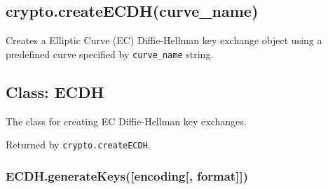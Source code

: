 \begin{Shaded}
\begin{Highlighting}[]
 \NormalTok{(}\NormalTok{);}
 \NormalTok{(}\NormalTok{);}
 \NormalTok{(}\NormalTok{);}

\NormalTok{();}
\NormalTok{();}

 \NormalTok{(}\NormalTok{(), }\NormalTok{, }\NormalTok{);}
 \NormalTok{(}\NormalTok{(), }\NormalTok{, }\NormalTok{);}

\end{Highlighting}
\end{Shaded}

\subsection{crypto.createECDH(curve\_name)}\label{crypto.createecdhcurveux5fname}

Creates a Elliptic Curve (EC) Diffie-Hellman key exchange object using a
predefined curve specified by \texttt{curve\_name} string.

\subsection{Class: ECDH}\label{class-ecdh}

The class for creating EC Diffie-Hellman key exchanges.

Returned by \texttt{crypto.createECDH}.

\subsubsection{ECDH.generateKeys({[}encoding{[},
format{]}{]})}\label{ecdh.generatekeysencoding-format}

